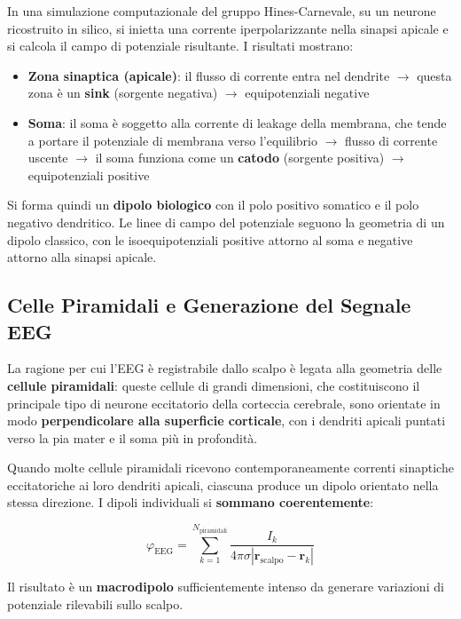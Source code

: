 In una simulazione computazionale del gruppo Hines-Carnevale, su un neurone ricostruito in silico, si inietta una corrente iperpolarizzante nella sinapsi apicale e si calcola il campo di potenziale risultante. I risultati mostrano:

\begin{itemize}
    \item \textbf{Zona sinaptica (apicale)}: il flusso di corrente entra nel dendrite $\rightarrow$ questa zona è un \textbf{sink} (sorgente negativa) $\rightarrow$ equipotenziali negative
    \item \textbf{Soma}: il soma è soggetto alla corrente di leakage della membrana, che tende a portare il potenziale di membrana verso l'equilibrio $\rightarrow$ flusso di corrente uscente $\rightarrow$ il soma funziona come un \textbf{catodo} (sorgente positiva) $\rightarrow$ equipotenziali positive
\end{itemize}

Si forma quindi un \textbf{dipolo biologico} con il polo positivo somatico e il polo negativo dendritico. Le linee di campo del potenziale seguono la geometria di un dipolo classico, con le isoequipotenziali positive attorno al soma e negative attorno alla sinapsi apicale.

\subsection{Celle Piramidali e Generazione del Segnale EEG}

La ragione per cui l'EEG è registrabile dallo scalpo è legata alla geometria delle \textbf{cellule piramidali}: queste cellule di grandi dimensioni, che costituiscono il principale tipo di neurone eccitatorio della corteccia cerebrale, sono orientate in modo \textbf{perpendicolare alla superficie corticale}, con i dendriti apicali puntati verso la pia mater e il soma più in profondità.

Quando molte cellule piramidali ricevono contemporaneamente correnti sinaptiche eccitatoriche ai loro dendriti apicali, ciascuna produce un dipolo orientato nella stessa direzione. I dipoli individuali si \textbf{sommano coerentemente}:

$$ \varphi_{\text{EEG}} = \sum_{k=1}^{N_{\text{piramidali}}} \frac{I_k}{4\pi\sigma |\mathbf{r}_{\text{scalpo}} - \mathbf{r}_k|} $$

Il risultato è un \textbf{macrodipolo} sufficientemente intenso da generare variazioni di potenziale rilevabili sullo scalpo.

